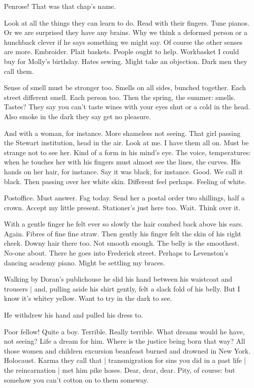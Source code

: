 Penrose!
That was that chap's name.

Look at all the things they can learn to do.
Read with their fingers.
Tune pianos.
Or we are surprised they have any brains.
Why we think a deformed person or a hunchback clever if he says something we might say.
Of course the other senses are more.
Embroider.
Plait baskets.
People ought to help.
Workbasket I could buy for Molly's birthday.
Hates sewing.
Might take an objection.
Dark men they call them.

Sense of smell must be stronger too.
Smells on all sides, bunched together.
Each street different smell.
Each person too.
Then the spring, the summer:
smells.
Tastes?
They say you can't taste wines with your eyes shut or a cold in the head.
Also smoke in the dark they say get no pleasure.

And with a woman, for instance.
More shameless not seeing.
That girl passing the Stewart institution,
head in the air.
Look at me.
I have them all on.
Must be strange not to see her.
Kind of a form in his mind's eye.
The voice, temperatures:
when he touches her with his fingers
must almost see the lines, the curves.
His hands on her hair, for instance.
Say it was black, for instance.
Good.
We call it black.
Then passing over her white skin.
Different feel perhaps.
Feeling of white.

Postoffice.
Must answer.
Fag today.
Send her a postal order
two shillings, half a crown.
Accept my little present.
Stationer's just here too.
Wait.
Think over it.

With a gentle finger
he felt ever so slowly the hair combed back above his ears.
Again.
Fibres of fine fine straw.
Then gently his finger felt
the skin of his right cheek.
Downy hair there too.
Not smooth enough.
The belly is the smoothest.
No-one about.
There he goes into Frederick street.
Perhaps to Levenston's dancing academy piano.
Might be settling my braces.

Walking by Doran's publichouse
he slid his hand between his waistcoat and trousers |
and, pulling aside his shirt gently,
felt a slack fold of his belly.
But I know it's whitey yellow.
Want to try in the dark to see.

He withdrew his hand and pulled his dress to.

Poor fellow!
Quite a boy.
Terrible.
Really terrible.
What dreams would he have,
not seeing?
Life a dream for him.
Where is the justice being born that way?
All those women and children excursion beanfeast burned and drowned in New York.
Holocaust.
Karma they call that |
transmigration for sins you did in a past life |
the reincarnation |
met him pike hoses.
Dear, dear, dear.
Pity, of course:
but somehow you can't cotton on to them someway.%

